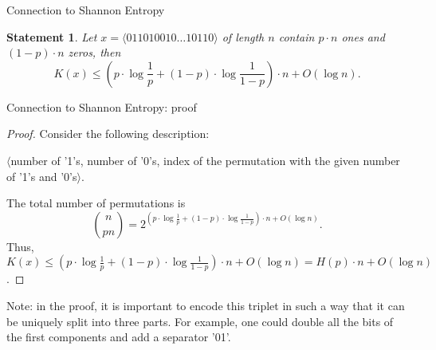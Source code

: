 \documentclass[aspectratio=169]{beamer}
\newtheorem{statement}{Statement}
\begin{document}
\begin{frame}{Connection to Shannon Entropy}
\begin{statement}\label{st:kologorov:entropy}
    Let $x = \langle{011010010\dotso 10110}\rangle$ of length $n$ contain $p \cdot n$ ones and $(1-p) \cdot n$ zeros, then
    \[
    K(x) \le \left(p \cdot \log \frac{1}{p} + (1-p) \cdot \log \frac{1}{1-p}\right) \cdot n + O(\log n).
    \]
    \end{statement}
\end{frame}

\begin{frame}{Connection to Shannon Entropy: proof}
    \begin{proof}
    Consider the following description:
    \begin{center}
        $\langle$number of '1's, number of '0's, index of the permutation with the given number of '1's and '0's$\rangle$.
    \end{center}
    The total number of permutations is
    \[
    \binom{n}{pn} = 2^{\left(p \cdot \log \frac{1}{p} + (1-p) \cdot \log \frac{1}{1-p}\right) \cdot n + O(\log n)}.
    \]
    Thus, $K(x) \le \left(p \cdot \log \frac{1}{p} + (1-p) \cdot \log \frac{1}{1-p}\right) \cdot n + O(\log n) = H(p) \cdot n + O(\log n)$.
    \end{proof}
    \pause
    Note: in the proof, it is important to encode this triplet in such a way that it can be uniquely split into three parts. For example, one could double all the bits of the first components and add a separator '01'.
\end{frame}
\end{document}

